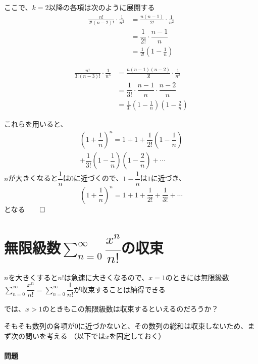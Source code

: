 \documentclass[../book_jiriki_calc]{subfiles}
\begin{document}
ここで、$k=2$以降の各項は次のように展開する
\begin{align}
  \frac{n!}{2!(n-2)!} \cdot \frac{1}{n^2}
   & = \frac{n(n-1)}{2!} \cdot \frac{1}{n^2}       \\
   & = \dfrac{1}{2!} \cdot \dfrac{n-1}{n}          \\
   & = \frac{1}{2!} \left( 1 - \frac{1}{n} \right)
\end{align}

\begin{align}
  \frac{n!}{3!(n-3)!} \cdot \frac{1}{n^3}
   & = \frac{n(n-1)(n-2)}{3!} \cdot \frac{1}{n^3}                                 \\
   & = \dfrac{1}{3!} \cdot \dfrac{n-1}{n} \cdot \dfrac{n-2}{n}                    \\
   & = \frac{1}{3!} \left( 1 - \frac{1}{n} \right) \left( 1 - \frac{2}{n} \right)
\end{align}

これらを用いると、
\begin{multline}
  \left(1+\dfrac{1}{n}\right)^n = 1 + 1 + \dfrac{1}{2!}\left(1-\dfrac{1}{n}\right) \\
  + \dfrac{1}{3!}\left(1-\dfrac{1}{n}\right)\left(1-\dfrac{2}{n}\right) + \cdots
\end{multline}
$n$が大きくなると$\dfrac{1}{n}$は$0$に近づくので、$1-\dfrac{1}{n}$は$1$に近づき、
\begin{equation}
  \left(1+\dfrac{1}{n}\right)^n = 1 + 1 + \dfrac{1}{2!} + \dfrac{1}{3!} + \cdots
\end{equation}
となる$\qed$

\section{無限級数$\displaystyle\sum_{n=0}^{\infty} \dfrac{x^n}{n!}$の収束}

$n$を大きくすると$n!$は急速に大きくなるので、$x=1$のときには無限級数$\displaystyle\sum_{n=0}^{\infty} \dfrac{x^n}{n!}=\sum_{n=0}^{\infty} \dfrac{1}{n!}$が収束することは納得できる

\br

では、$x>1$のときもこの無限級数は収束するといえるのだろうか？

\sectionline

そもそも数列の各項が$0$に近づかないと、その数列の総和は収束しないため、まず次の問いを考える
（以下では$x$を固定しておく）

\br

\paragraph{問題}
\end{document}
